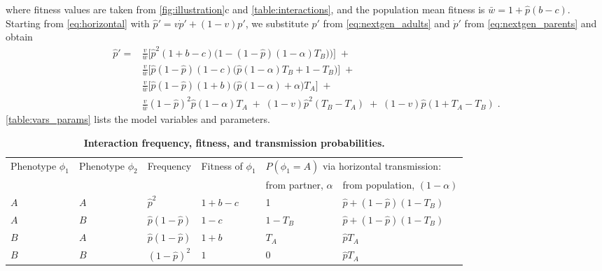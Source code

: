 \documentclass[12pt]{extarticle}
\begin{document}
where fitness values are taken from \autoref{fig:illustration}c and \autoref{table:interactions}, and the population mean fitness is
$\bar{w} =  1 + \hat{p}(b-c)$.
Starting from \autoref{eq:horizontal} with $\hat{p}'=v\dot{p}'+(1-v)p'$, we substitute $p'$ from \autoref{eq:nextgen_adults} and $\dot{p}'$ from \autoref{eq:nextgen_parents} and obtain
\begin{equation} \label{eq:nextgen_juveniles}
\begin{aligned}
\hat{p}' =
& \frac{v}{\bar{w}}\Big[\hat{p}^2(1+b-c)\Big(1-(1-\hat{p})(1-\alpha)T_B)\Big)\Big] \;+ \\
& \frac{v}{\bar{w}}\Big[ \hat{p}(1-\hat{p})(1-c)\big( \hat{p}(1-\alpha)T_B + 1 - T_B \big) \Big] \;+ \\
& \frac{v}{\bar{w}}\Big[ \hat{p}(1-\hat{p})(1+b)\big(\hat{p}(1-\alpha) + \alpha \big) T_A \Big] \;+ \\
& \frac{v}{\bar{w}}(1-\hat{p})^2\hat{p}(1-\alpha)T_A \;+\;
(1-v)\hat{p}^2(T_B-T_A) \;+\;
(1-v)\hat{p}(1+T_A-T_B) \;.
\end{aligned}
\end{equation}
\autoref{table:vars_params} lists the model variables and parameters.

\begin{table}[h]
  \caption{\textbf{Interaction frequency, fitness, and transmission probabilities.}}
  \begin{tabular}{@{}llllll@{}}
  \toprule
  \multirow{2}{*}{Phenotype $\phi_1$} &
    \multirow{2}{*}{Phenotype $\phi_2$} &
    \multirow{2}{*}{Frequency} &
    \multirow{2}{*}{Fitness of $\phi_1$} &
    \multicolumn{2}{l}{$P(\phi_1=A)$ via horizontal transmission:} \\ \cmidrule(l){5-6} 
      &     &                      &         & from partner, $\alpha$ & from population, $(1-\alpha)$ \\ \cmidrule(r){1-6}
  $A$ & $A$ & $\hat{p}^2$          & $1+b-c$ & 1                      & $\hat{p}+(1-\hat{p})(1-T_B)$  \\
  $A$ & $B$ & $\hat{p}(1-\hat{p})$ & $1-c$   & $1-T_B$                & $\hat{p}+(1-\hat{p})(1-T_B)$  \\
  $B$ & $A$ & $\hat{p}(1-\hat{p})$ & $1+b$   & $T_A$                  & $\hat{p} T_A$                 \\
  $B$ & $B$ & $(1-\hat{p})^2$      & $1$     & $0$                    & $\hat{p} T_A$                 \\ \bottomrule
  \end{tabular}
  \label{table:interactions}
\end{table}
\bigskip
\end{document}
